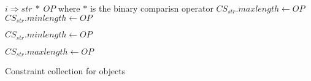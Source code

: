 \begin{algorithm}
\scriptsize
\DontPrintSemicolon
{}
\Begin
{ 
  {
   $i \Rightarrow str\ *\ OP$\;
   where $*$ is the binary comparisn operator\;
   {
    $CS_{str}.maxlength \longleftarrow OP$\;
    $CS_{str}.minlength \longleftarrow OP$\;
   }
   
   {
    $CS_{str}.minlength \longleftarrow OP$\;
   }
   
   {
    $CS_{str}.maxlength \longleftarrow OP$\;
   }
  }
}
\caption{Constraint collection for  objects}
 \label{algo:constraintCollection}
\end{algorithm}
